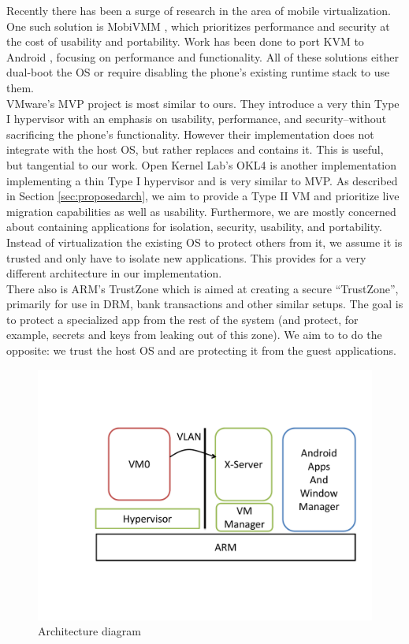 Recently there has been a surge of research in the area of mobile virtualization.  One such solution is MobiVMM \cite{mobivmm}, which prioritizes performance and security at the cost of usability and portability.  Work has been done to port KVM to Android \cite{columbia}, focusing on performance and functionality.  All of these solutions either dual-boot the OS or require disabling the phone's existing runtime stack to use them. \\

VMware's MVP project \cite{mvp} is most similar to ours.  They introduce a very thin Type I hypervisor with an emphasis on usability, performance, and security--without sacrificing the phone's functionality.   However their implementation does not integrate with the host OS, but rather replaces and contains it.  This is useful, but tangential to our work.  Open Kernel Lab's OKL4 \cite{okl4} is another implementation implementing a thin Type I hypervisor and is very similar to MVP.  As described in Section \ref{sec:proposedarch}, we aim to provide a Type II VM and prioritize live migration capabilities as well as usability.  Furthermore, we are mostly concerned about containing applications for isolation, security, usability, and portability.  Instead of virtualization the existing OS to protect others from it, we assume it is trusted and only have to isolate new applications.  This provides for a very different architecture in our implementation. \\

There also is ARM's TrustZone \cite{trustzone} which is aimed at creating a secure ``TrustZone'', primarily for use in DRM, bank transactions and other similar setups.  The goal is to protect a specialized app from the rest of the system (and protect, for example, secrets and keys from leaking out of this zone).  We aim to to do the opposite: we trust the host OS and are protecting it from the guest applications.

\begin{figure}[tbh]
\centering
\includegraphics[width=1.0\columnwidth]{arch}
\caption{Architecture diagram}
\label{fig:arch}
\end{figure}

